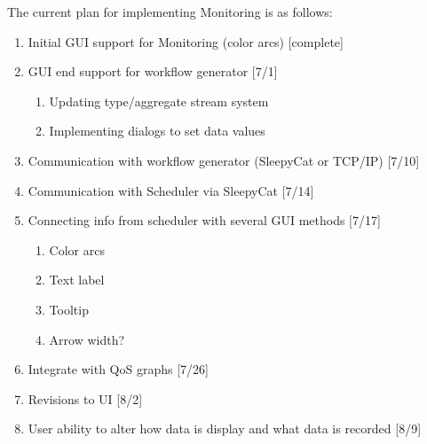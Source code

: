 \documentclass[a4paper,12pt]{article}
\begin{document}
The current plan for implementing Monitoring is as follows:
\begin{enumerate}
\item Initial GUI support for Monitoring (color arcs) [complete]
\item GUI end support for workflow generator [7/1]
\begin{enumerate}
\item Updating type/aggregate stream system
\item Implementing dialogs to set data values
\end{enumerate}
\item Communication with workflow generator (SleepyCat or TCP/IP) [7/10]
\item Communication with Scheduler via SleepyCat [7/14]
\item Connecting info from scheduler with several GUI methods [7/17]
\begin{enumerate}
\item Color arcs
\item Text label
\item Tooltip
\item Arrow width?
\end{enumerate}
\item Integrate with QoS graphs [7/26]
\item Revisions to UI [8/2]
\item User ability to alter how data is display and what data is recorded [8/9]
\end{enumerate}
\end{document}
